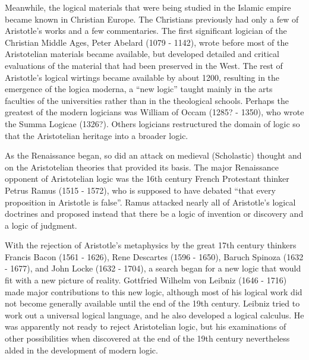 \documentclass{article}
\begin{document}
    Meanwhile, the logical materials that were being studied in the Islamic empire became known in Christian Europe. The Christians previously had only a few of Aristotle's works and a few commentaries. The first significant logician of the Christian Middle Ages, Peter Abelard (1079 - 1142), wrote before most of the Aristotelian materials became available, but developed detailed and critical evaluations of the material that had been preserved in the West. The rest of Aristotle's logical wirtings became available by about 1200, resulting in the emergence of the logica moderna, a ``new logic'' taught mainly in the arts faculties of the universities rather than in the theological schools. Perhaps the greatest of the modern logicians was William of Occam (1285? - 1350), who wrote the Summa Logicae (1326?). Others logicians restructured the domain of logic so that the Aristotelian heritage into a broader logic. \par
    
    As the Renaissance began, so did an attack on medieval (Scholastic) thought and on the Aristotelian theories that provided its basis. The major Renaissance opponent of Aristotelian logic was the 16th century French Protestant thinker Petrus Ramus (1515 - 1572), who is supposed to have debated ``that every proposition in Aristotle is false''. Ramus attacked nearly all of Aristotle's logical doctrines and proposed instead that there be a logic of invention or discovery and a logic of judgment. \par
    
    With the rejection of Aristotle's metaphysics by the great 17th century thinkers Francis Bacon (1561 - 1626), Rene Descartes (1596 - 1650), Baruch Spinoza (1632 - 1677), and John Locke (1632 - 1704), a search began for a new logic that would fit with a new picture of reality. Gottfried Wilhelm von Leibniz (1646 - 1716) made major contributions to this new logic, although most of his logical work did not become generally available until the end of the 19th century. Leibniz tried to work out a universal logical language, and he also developed a logical calculus. He was apparently not ready to reject Aristotelian logic, but his examinations of other possibilities when discovered at the end of the 19th century nevertheless alded in the development of modern logic. \par
    
    
\newpage
    
\end{document}

